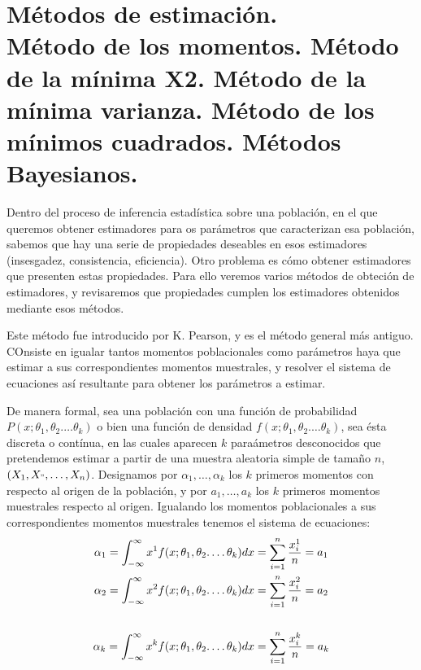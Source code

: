 \chapter[M\'etodos de estimaci\'on.]{M\'etodos de estimaci\'on.  \\
\normalsize M\'etodo de los momentos. M\'etodo de la m\'inima X2. M\'etodo de la m\'inima varianza. M\'etodo de los m\'inimos cuadrados. M\'etodos Bayesianos.}


Dentro del proceso de inferencia estad\'istica sobre una poblaci\'on, en el que queremos obtener estimadores para os par\'ametros que caracterizan esa poblaci\'on, sabemos que hay una serie de propiedades deseables en esos estimadores (insesgadez, consistencia, eficiencia). Otro problema es c\'omo obtener estimadores que presenten estas propiedades. Para ello veremos varios m\'etodos de obteci\'on de estimadores, y revisaremos que propiedades cumplen los estimadores obtenidos mediante esos m\'etodos.


Este m\'etodo fue introducido por K. Pearson, y es el m\'etodo general m\'as antiguo. COnsiste en igualar tantos momentos poblacionales como par\'ametros haya que estimar a sus correspondientes momentos muestrales, y resolver el sistema de ecuaciones as\'i resultante para obtener los par\'ametros a estimar.

De manera formal, sea una poblaci\'on con una funci\'on de probabilidad $P(x;\theta_1,\theta_2.\ldots\theta_k)$ o bien una funci\'on de densidad $f(x;\theta_1,\theta_2.\ldots\theta_k)$, sea \'esta discreta o cont\'inua, en las cuales aparecen $k$ para\'ametros desconocidos que pretendemos estimar a partir de una muestra aleatoria simple de tama\~no $n$, $(X_1,X_",\ldots,X_n)$. Designamos por $\alpha_1,\ldots,\alpha_k$ los $k$ primeros momentos con respecto al origen de la poblaci\'on, y por $a_1,\ldots,a_k$ los $k$ primeros momentos muestrales respecto al origen. Igualando los momentos poblacionales a sus correspondientes momentos muestrales tenemos el sistema de ecuaciones:
\begin{align*}
\alpha_1=\int_{-\infty}^{\infty}x^1f(x;\theta_1,\theta_2.\ldots\theta_k)dx&=\sum_{i=1}^{n}\dfrac{x_i^1}{n}=a_1 \\
\alpha_2=\int_{-\infty}^{\infty}x^2f(x;\theta_1,\theta_2.\ldots\theta_k)dx&=\sum_{i=1}^{n}\dfrac{x_i^2}{n}=a_2 \\
\dotfill & \dotfill \\
\alpha_k=\int_{-\infty}^{\infty}x^kf(x;\theta_1,\theta_2.\ldots\theta_k)dx&=\sum_{i=1}^{n}\dfrac{x_i^k}{n}=a_k 
\end{align*}

